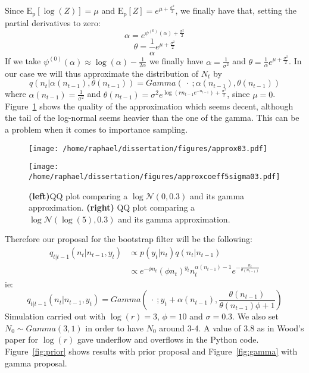 \documentclass{article}
\begin{document}
Since $\mathrm{E_p}[\log(Z)]=\mu$ and $\mathrm{E_p}[Z] = e^{\mu+\frac{\sigma^2}{2}}$, we finally have that, setting the partial derivatives to zero:
\begin{equation*}
\alpha=e^{\psi^{(0)}(\alpha)+\frac{\sigma^2}{2}}
\end{equation*}
\begin{equation*}
\theta=\frac{1}{\alpha}e^{\mu+\frac{\sigma^2}{2}}
\end{equation*}
If we take $\psi^{(0)}(\alpha) \approx \log(\alpha)-\frac{1}{2\alpha}$ we finally have $\alpha =\frac{1}{\sigma^2}$ and $\theta=\frac{1}{\alpha}e^{\mu+\frac{\sigma^2}{2}}$.
In our case we will thus approximate the distribution of $N_t$ by
\begin{equation*}
q(n_t|\alpha(n_{t-1}), \theta(n_{t-1})) = Gamma(\ \cdot \ ; \alpha(n_{t-1}), \theta(n_{t-1}) )
\end{equation*}
where $ \alpha(n_{t-1})= \frac{1}{\sigma^2}$ and $\theta(n_{t-1})=\sigma^2e^{\log(rn_{t-1}e^{-n_{t-1}})+\frac{\sigma^2}{2}}$, since $\mu = 0$.\\
Figure~\ref{fig:approx} shows the quality of the approximation which seems decent, although the tail of the log-normal seems heavier than the one of the gamma. This can be a problem when it comes to importance sampling.

\begin{figure}[htb]
	\centering
	\begin{minipage}{.45\textwidth}
		\centering
		\texttt{[image: /home/raphael/dissertation/figures/approx03.pdf]}
	\end{minipage}
	\begin{minipage}{.45\textwidth}
		\centering
		\texttt{[image: /home/raphael/dissertation/figures/approxcoeff5sigma03.pdf]}
	\end{minipage}
	\caption{\textbf{(left)}QQ plot comparing a $\log\mathcal{N}(0, 0.3)$ and its gamma approximation. \textbf{(right)} QQ plot comparing a $\log\mathcal{N}(\log(5), 0.3)$ and its gamma approximation.}
	\label{fig:approx}
\end{figure}

Therefore our proposal for the bootstrap filter will be the following:
\begin{equation*}
\begin{split}
q_{t|t-1}(n_t|n_{t-1}, y_t) & \propto  p(y_t|n_t)q(n_t|n_{t-1}) \\
& \propto e^{-\phi n_t}(\phi n_t)^{y_t}n_t^{\alpha(n_{t-1})-1}e^{-\frac{n_t}{\theta(n_{t-1})}}
\end{split}
\end{equation*}
ie:
\begin{equation*}
q_{t|t-1}(n_t|n_{t-1}, y_t) = Gamma(\ \cdot \ ; y_t+\alpha(n_{t-1}), \frac{\theta(n_{t-1})}{\theta(n_{t-1})\phi + 1})\end{equation*}
Simulation carried out with $\log(r)=3$, $\phi=10$ and $\sigma=0.3$. We also set $N_0 \sim Gamma(3,1)$ in order to have $N_0$ around 3-4. A value of 3.8 as in Wood's paper for $\log(r)$ gave underflow and overflows in the Python code. Figure~\ref{fig:prior} shows results with prior proposal and Figure~\ref{fig:gamma} with gamma proposal.
\end{document}
